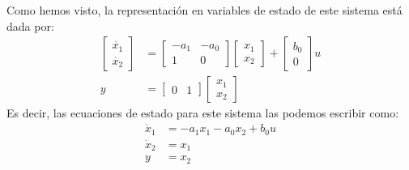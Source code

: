 \documentclass[]{scrartcl}
\begin{document}
Como hemos visto, la representación en variables de estado de este sistema está dada por:
\begin{align*}
	\begin{bmatrix}
		\dot{x_1} \\
		\dot{x_2}
	\end{bmatrix}&=
	\begin{bmatrix}
		-a_1 & -a_0  \\
		1 & 0
	\end{bmatrix}	
	\begin{bmatrix}
		 x_1 \\
		 x_2
	\end{bmatrix} + 
		\begin{bmatrix}
		b_0 \\
		0
	\end{bmatrix} u 	\\
	y &= \begin{bmatrix}
		0 & 1
	\end{bmatrix}
		\begin{bmatrix}
		x_1 \\
		x_2
	\end{bmatrix}
\end{align*}
Es decir, las ecuaciones de estado para este sistema las podemos escribir como:
\begin{align}
	\dot{x}_1&= -a_1 x_1 -a_0  x_2 + b_0 u\nonumber\\
	\dot{x}_2&= x_1\nonumber\\
	y&=x_2\label{equ:est2orden}
\end{align}
\end{document}
